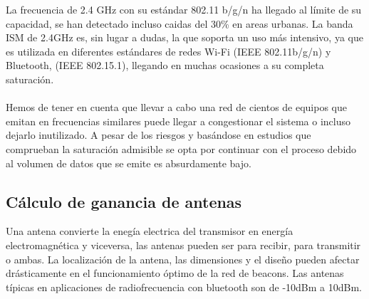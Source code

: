 \documentclass[a4paper ,12pt, onecolumn]{article}
\begin{document}
            La frecuencia de 2.4 GHz con su estándar 802.11 b/g/n ha llegado al límite de su capacidad, se han
            detectado incluso caidas del 30\% en areas urbanas.  
            La banda ISM de 2.4GHz es, sin lugar a dudas, la que soporta un uso más intensivo, ya que es utilizada en 
            diferentes estándares de redes Wi-Fi (IEEE 802.11b/g/n) y Bluetooth, (IEEE 802.15.1), llegando en muchas 
            ocasiones a su completa saturación.
            \paragraph{}
            Hemos de tener en cuenta que llevar a cabo una red de cientos de equipos que emitan en frecuencias similares puede
            llegar a congestionar el sistema o incluso dejarlo inutilizado. A pesar de los riesgos y basándose en estudios que 
            comprueban la saturación admisible se opta por continuar con el proceso debido al volumen de datos que se emite es 
            absurdamente bajo.
    \subsection{Cálculo de ganancia de antenas}
            Una antena convierte la enegía electrica del transmisor en energía electromagnética y viceversa, las antenas pueden ser 
            para recibir, para transmitir o ambas. La localización de la antena, las dimensiones y el diseño pueden afectar drásticamente
            en el funcionamiento óptimo de la red de beacons. 
            Las antenas típicas en aplicaciones de radiofrecuencia con bluetooth son de -10dBm a 10dBm.
\end{document}
